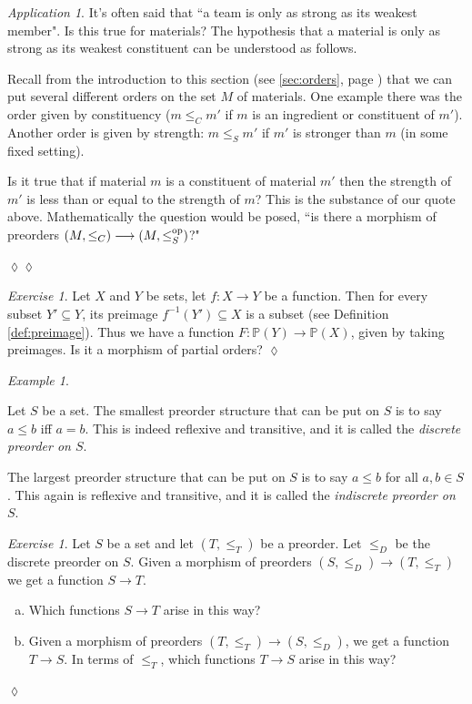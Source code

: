 \documentclass{book}
\def\tn{\textnormal}
\def\PP{{\mathbb P}}
\def\to{\rightarrow}
\def\taking{\colon}
\def\too{\longrightarrow}
\def\ss{\subseteq}
\def\m1{{-1}}
\def\op{^\tn{op}}
\theoremstyle{remark}
\newtheorem{example}[subsubsection]{Example}
\newtheorem{exc}[subsubsection]{Exercise}
\newenvironment{exercise}{\begin{exc}}{\hspace*{\fill}$\lozenge$\end{exc}}
\newtheorem{app}[subsubsection]{Application}
\newenvironment{application}{\begin{app}}{\hspace*{\fill}$\lozenge\lozenge$\end{app}}
\theoremstyle{definition}
\def\sexc{\begin{enumerate}[a.)]\setlength{\itemsep}{.1cm}\setlength{\parskip}{.1cm}\item}
\def\next{\item}
\def\endsexc{\end{enumerate}}
\begin{document}
\begin{application}

It's often said that ``a team is only as strong as its weakest member". Is this true for materials? The hypothesis that a material is only as strong as its weakest constituent can be understood as follows. 

Recall from the introduction to this section (see \ref{sec:orders}, page \pageref{sec:orders}) that we can put several different orders on the set $M$ of materials. One example there was the order given by constituency ($m\leq_C m'$ if $m$ is an ingredient or constituent of $m'$). Another order is given by strength: $m\leq_S m'$ if $m'$ is stronger than $m$ (in some fixed setting). 

Is it true that if material $m$ is a constituent of material $m'$ then the strength of $m'$ is less than or equal to the strength of $m$? This is the substance of our quote above. Mathematically the question would be posed, ``is there a morphism of preorders $(M,\leq_C)\too(M,\leq_S\op)$?"

\end{application}

\begin{exercise}
Let $X$ and $Y$ be sets, let $f\taking X\to Y$ be a function. Then for every subset $Y'\ss Y$, its preimage $f^\m1(Y')\ss X$ is a subset (see Definition \ref{def:preimage}). Thus we have a function $F\taking\PP(Y)\to\PP(X)$, given by taking preimages. Is it a morphism of partial orders?
\end{exercise}

\begin{example}\label{ex:discrete and indiscrete}

Let $S$ be a set. The smallest preorder structure that can be put on $S$ is to say $a\leq b$ iff $a=b$. This is indeed reflexive and transitive, and it is called the {\em discrete preorder on $S$}.

The largest preorder structure that can be put on $S$ is to say $a\leq b$ for all $a,b\in S$. This again is reflexive and transitive, and it is called the {\em indiscrete preorder on $S$}.

\end{example}

\begin{exercise}
Let $S$ be a set and let $(T,\leq_T)$ be a preorder. Let $\leq_D$ be the discrete preorder on $S$. Given a morphism of preorders $(S,\leq_D)\to (T,\leq_T)$ we get a function $S\to T$. 
\sexc Which functions $S\to T$ arise in this way? 
\next Given a morphism of preorders $(T,\leq_T)\to(S,\leq_D)$, we get a function $T\to S$. In terms of $\leq_T$, which functions $T\to S$ arise in this way?
\endsexc
\end{exercise}
\end{document}
